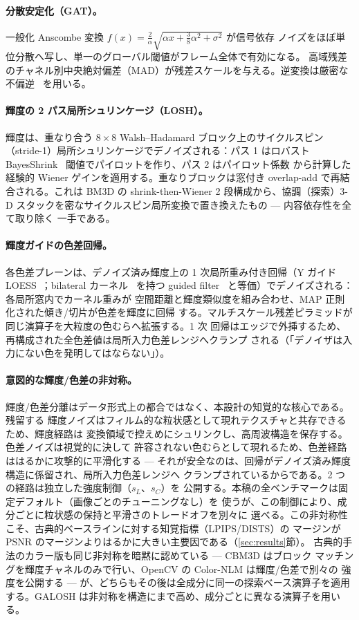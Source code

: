 \documentclass[10pt,twocolumn]{article}
\begin{document}
\paragraph{分散安定化（GAT）。}
一般化 Anscombe 変換
$f(x)=\tfrac{2}{\alpha}\sqrt{\alpha x+\tfrac38\alpha^2+\sigma^2}$ が信号依存
ノイズをほぼ単位分散へ写し、単一のグローバル閾値がフレーム全体で有効になる。
高域残差のチャネル別中央絶対偏差（MAD）が残差スケールを与える。逆変換は厳密な
不偏逆~\cite{makitalo} を用いる。

\paragraph{輝度の 2 パス局所シュリンケージ（LOSH）。}
輝度は、重なり合う $8{\times}8$ Walsh--Hadamard ブロック上のサイクルスピン
（stride-1）局所シュリンケージでデノイズされる：パス 1 はロバスト
BayesShrink~\cite{bayesshrink} 閾値でパイロットを作り、パス 2 はパイロット係数
から計算した経験的 Wiener ゲインを適用する。重なりブロックは窓付き overlap-add
で再結合される。これは BM3D の shrink-then-Wiener 2 段構成から、協調（探索）3-D
スタックを密なサイクルスピン局所変換で置き換えたもの --- 内容依存性を全て取り除く
一手である。

\paragraph{輝度ガイドの色差回帰。}
各色差プレーンは、デノイズ済み輝度上の 1 次局所重み付き回帰（Y ガイド
LOESS~\cite{loess}；bilateral カーネル~\cite{kopf} を持つ guided
filter~\cite{guidedfilter} と等価）でデノイズされる：各局所窓内でカーネル重みが
空間距離と輝度類似度を組み合わせ、MAP 正則化された傾き/切片が色差を輝度に回帰
する。マルチスケール残差ピラミッドが同じ演算子を大粒度の色むらへ拡張する。1 次
回帰はエッジで外挿するため、再構成された全色差値は局所入力色差レンジへクランプ
される（「デノイザは入力にない色を発明してはならない」）。

\paragraph{意図的な輝度/色差の非対称。}
輝度/色差分離はデータ形式上の都合ではなく、本設計の知覚的な核心である。残留する
輝度ノイズはフィルム的な粒状感として現れテクスチャと共存できるため、輝度経路は
変換領域で控えめにシュリンクし、高周波構造を保存する。色差ノイズは視覚的に決して
許容されない色むらとして現れるため、色差経路ははるかに攻撃的に平滑化する ---
それが安全なのは、回帰がデノイズ済み輝度構造に係留され、局所入力色差レンジへ
クランプされているからである。2 つの経路は独立した強度制御（$s_L$、$s_C$）を
公開する。本稿の全ベンチマークは固定デフォルト（画像ごとのチューニングなし）を
使うが、この制御により、成分ごとに粒状感の保持と平滑さのトレードオフを別々に
選べる。この非対称性こそ、古典的ベースラインに対する知覚指標（LPIPS/DISTS）の
マージンが PSNR のマージンよりはるかに大きい主要因である（\ref{sec:results}節）。
古典的手法のカラー版も同じ非対称を暗黙に認めている --- CBM3D はブロック
マッチングを輝度チャネルのみで行い、OpenCV の Color-NLM は輝度/色差で別々の
強度を公開する --- が、どちらもその後は全成分に同一の探索ベース演算子を適用
する。GALOSH は非対称を構造にまで高め、成分ごとに異なる演算子を用いる。
\end{document}
